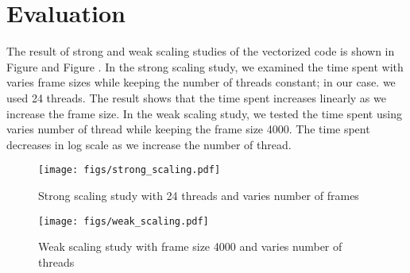 \section{Evaluation}\label{sec:evaluation}
The result of strong and weak scaling studies of the vectorized code is shown in Figure  and Figure . In the strong scaling study, we examined the time spent with varies frame sizes while keeping the number of threads constant; in our case. we used 24 threads. The result shows that the time spent increases linearly as we increase the frame size. In the weak scaling study, we tested the time spent using varies number of thread while keeping the frame size 4000. The time spent decreases in log scale as we increase the number of thread. 

\begin{figure}[h]
	\centering
	\texttt{[image: figs/strong\_scaling.pdf]}
	\caption{Strong scaling study with 24 threads and varies number of frames}
	\label{fig:strong scaling}
\end{figure}


\begin{figure}[h]
	\centering
	\texttt{[image: figs/weak\_scaling.pdf]}
	\caption{Weak scaling study with frame size 4000 and varies number of threads}
	\label{fig:weak scaling}
\end{figure}
